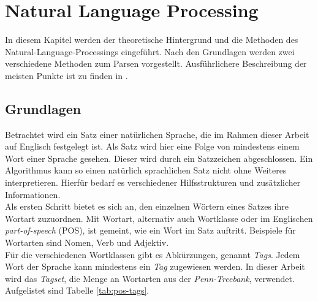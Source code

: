 %
\chapter{Natural Language Processing}
\label{sec:nlp}
In diesem Kapitel werden der theoretische Hintergrund und die Methoden des Natural-Language-Processings eingeführt. Nach den Grundlagen werden zwei verschiedene Methoden zum Parsen vorgestellt. Ausführlichere Beschreibung der meisten Punkte ist zu finden in \cite{nlpGrundlagen}.

\section{Grundlagen}
\label{sec:nlp:grundlagen}

Betrachtet wird ein Satz einer natürlichen Sprache, die im Rahmen dieser Arbeit auf Englisch festgelegt ist. Als Satz wird hier eine Folge von mindestens einem Wort einer Sprache gesehen. Dieser wird durch ein Satzzeichen abgeschlossen.
Ein Algorithmus kann so einen natürlich sprachlichen Satz nicht ohne Weiteres interpretieren. Hierfür bedarf es verschiedener Hilfsstrukturen und zusätzlicher Informationen.\\
Als ersten Schritt bietet es sich an, den einzelnen Wörtern eines Satzes ihre Wortart zuzuordnen. Mit Wortart, alternativ auch Wortklasse oder im Englischen \textit{part-of-speech} (POS), ist gemeint, wie ein Wort im Satz auftritt. Beispiele für Wortarten sind Nomen, Verb und Adjektiv. \\
Für die verschiedenen Wortklassen gibt es Abkürzungen, genannt \textit{Tags}. Jedem Wort der Sprache kann mindestens ein \textit{Tag} zugewiesen werden. In dieser Arbeit wird das \textit{Tagset}, die Menge an Wortarten aus der \textit{Penn-Treebank}, verwendet. Aufgelistet sind  Tabelle \ref{tab:pos-tags}. %

